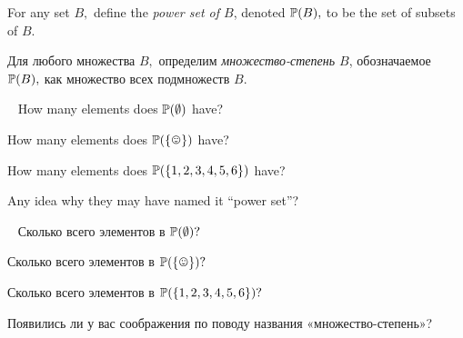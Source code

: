 \documentclass[CT4S-EN-RU]{subfiles}
\begin{document}
\begin{definitionENG}\label{def:power set}
For any set $B,$ define the {\em power set of $B$}, denoted ${\mathbb P}(B),$ to be the set of subsets of $B.$
\end{definitionENG}

\begin{definitionRUS}\label{def:power set}
Для любого множества $B,$ определим {\em множество-степень $B$}, обозначаемое ${\mathbb P}(B),$ как множество всех подмножеств $B.$
\end{definitionRUS}

\begin{exerciseENG}\label{exc:size of power sets}~
\sexc How many elements does ${\mathbb P}(\emptyset)$ have? 
\item How many elements does $\PP(\singleton)$ have? 
\item How many elements does ${\mathbb P}(\{1,2,3,4,5,6\})$ have? 
\item Any idea why they may have named it “power set”?
\endsexc
\end{exerciseENG}

\begin{exerciseRUS}\label{exc:size of power sets}~
\sexc Сколько всего элементов в ${\mathbb P}(\emptyset)?$ 
\item Сколько всего элементов в $\PP(\singleton)?$ 
\item Сколько всего элементов в ${\mathbb P}(\{1,2,3,4,5,6\})?$ 
\item Появились ли у вас соображения по поводу названия «множество-степень»?
\endsexc
\end{exerciseRUS}


\subsubsection{}\label{sec:simplicial complex}
\end{document}
